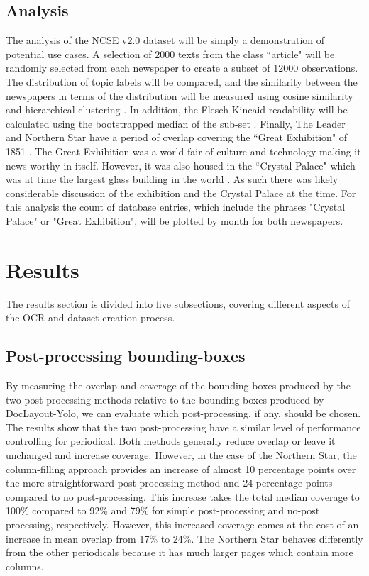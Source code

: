 \documentclass{article} %
\begin{document}
\subsection{Analysis}

The analysis of the NCSE v2.0 dataset will be simply a demonstration of potential use cases. A selection of 2000 texts from the class ``article" will be randomly selected from each newspaper to create a subset of 12000 observations. The distribution of topic labels will be compared, and the similarity between the newspapers in terms of the distribution will be measured using cosine similarity and hierarchical clustering \cite{mullner_modern_2011}. In addition, the Flesch-Kincaid readability \cite{flesch_new_1948} will be calculated using the bootstrapped median of the sub-set \cite{efron_introduction_1993}. Finally, The Leader and Northern Star have a period of overlap covering the ``Great Exhibition" of 1851 \cite{luckhurst_great_1951}. The Great Exhibition was a world fair of culture and technology making it news worthy in itself. However, it was also housed in the ``Crystal Palace" which was at time the largest glass building in the world \cite{addis_crystal_2006}. As such there was likely considerable discussion of the exhibition and the Crystal Palace at the time. For this analysis the count of database entries, which include the phrases "Crystal Palace" or "Great Exhibition", will be plotted by month for both newspapers.


\section{Results}

The results section is divided into five subsections, covering different aspects of the OCR and dataset creation process. 

\subsection{Post-processing bounding-boxes}

By measuring the overlap and coverage of the bounding boxes produced by the two post-processing methods relative to the bounding boxes produced by DocLayout-Yolo, we can evaluate which post-processing, if any, should be chosen. The results show that the two post-processing have a similar level of performance controlling for periodical. Both methods generally reduce overlap or leave it unchanged and increase coverage. However, in the case of the Northern Star, the column-filling approach provides an increase of almost 10 percentage points over the more straightforward post-processing method and 24 percentage points compared to no post-processing. This increase takes the total median coverage to 100\% compared to 92\% and 79\% for simple post-processing and no-post processing, respectively. However, this increased coverage comes at the cost of an increase in mean overlap from 17\% to 24\%.
The Northern Star behaves differently from the other periodicals because it has much larger pages which contain more columns.
\end{document}
